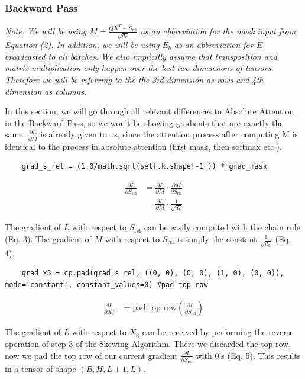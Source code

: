 \documentclass[a4paper,12pt]{extarticle}
\begin{document}
\subsubsection{Backward Pass}
\textit{Note: We will be using $M = \frac{QK^T+S_\text{rel}}{\sqrt{d_k}}$ as an abbreviation for the mask input from Equation (2). In addition, we will be using $E_b$ as an abbreviation for $E$ broadcasted to all batches. We also implicitly assume that transposition and matrix multiplication only happen over the last two dimensions of tensors. Therefore we will be referring to the the 3rd dimension as rows and 4th dimension as columns.}\newline

In this section, we will go through all relevant differences to Absolute Attention in the Backward Pass, so we won't be showing gradients that are exactly the same. $\frac{\partial L}{\partial M}$ is already given to us, since the attention process after computing M is identical to the process in absolute attention (first mask, then softmax etc.).\newline

\begin{lstlisting}
    grad_s_rel = (1.0/math.sqrt(self.k.shape[-1])) * grad_mask
\end{lstlisting}
\begin{align}
\frac{\partial L}{\partial S_\text{rel}}
&= \frac{\partial L}{\partial M} \cdot \frac{\partial M}{\partial S_\text{rel}} \\[0.15cm]
&= \frac{\partial L}{\partial M} \cdot \frac{1}{\sqrt{d_k}}
\end{align}

\raggedright The gradient of $L$ with respect to $S_\text{rel}$ can be easily computed with the chain rule (Eq. 3). The gradient of $M$ with respect to $S_\text{rel}$ is simply the constant $\frac{1}{\sqrt{d_k}}$ (Eq. 4). \newline
\vspace{0.1cm}
\begin{lstlisting}
    grad_x3 = cp.pad(grad_s_rel, ((0, 0), (0, 0), (1, 0), (0, 0)), mode='constant', constant_values=0) #pad top row
\end{lstlisting}
\begin{align}
\frac{\partial L}{\partial X_3}&=\text{pad\_top\_row}\left(\frac{\partial L}{\partial S_\text{rel}}\right)
\end{align}

The gradient of $L$ with respect to $X_3$ can be received by performing the reverse operation of step 3 of the Skewing Algorithm. There we discarded the top row, now we pad the top row of our current gradient $\frac{\partial L}{\partial S_\text{rel}}$ with 0's (Eq. 5). This results in a tensor of shape $(B, H, L + 1, L)$. \newline
\vspace{0.1cm}
\end{document}
